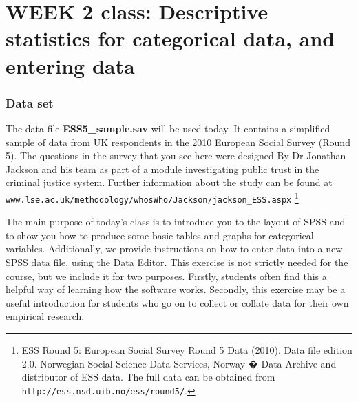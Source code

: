 \newpage
\section[Week 2: Descriptive statistics 1]{WEEK 2 class: Descriptive statistics for categorical data, and entering data}
\label{p_class1}

\subsubsection{Data set}

The data file \textbf{ESS5\_sample.sav} will be used today.
It contains a simplified sample of data
from UK respondents in the 2010 European Social Survey (Round 5).
The questions in the survey that you see here were designed
By Dr Jonathan Jackson and his team as part of a module investigating
public trust in the criminal justice system. Further information about the
study can be found at\\
\texttt{www.lse.ac.uk/methodology/whosWho/Jackson/jackson\_ESS.aspx}
\footnote{ESS Round 5: European Social Survey Round 5 Data (2010). Data file edition 2.0. Norwegian Social Science Data Services, Norway � Data Archive and distributor of ESS data. The full data can be
obtained from \texttt{http://ess.nsd.uib.no/ess/round5/}.}

The main purpose of today's class is to introduce you to the layout of SPSS and to show you
how to produce some basic tables and graphs for categorical variables.
Additionally, we provide instructions on how to enter data into a new SPSS
data file, using the Data Editor. This exercise is not strictly needed for the course, but
we include it for two purposes. Firstly, students often find this a helpful
way of learning how the software works. Secondly, this exercise may be a useful introduction
for students who go on to collect or collate data for their own empirical research.



